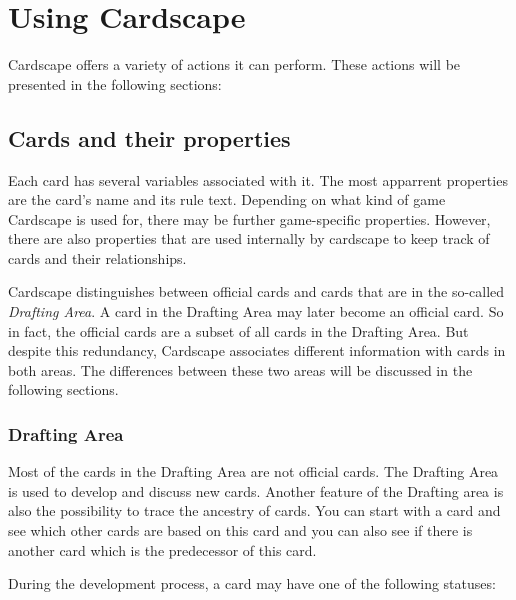 \documentclass[a4paper, 11pt]{scrbook}
\begin{document}
\chapter{Using Cardscape}
Cardscape offers a variety of actions it can perform. These actions will be presented in the following sections:


\section{Cards and their properties}
Each card has several variables associated with it. The most apparrent properties are the card's name and its rule text. Depending on what kind of game Cardscape is used for, there may be further game-specific properties. However, there are also properties that are used internally by cardscape to keep track of cards and their relationships.

Cardscape distinguishes between official cards and cards that are in the so-called \emph{Drafting Area}. A card in the Drafting Area may later become an official card. So in fact, the official cards are a subset of all cards in the Drafting Area. But despite this redundancy, Cardscape associates different information with cards in both areas. The differences between these two areas will be discussed in the following sections.

\subsection{Drafting Area}\label{DraftingArea}
Most of the cards in the Drafting Area are not official cards. The Drafting Area is used to develop and discuss new cards. Another feature of the Drafting area is also the possibility to trace the ancestry of cards. You can start with a card and see which other cards are based on this card and you can also see if there is another card which is the predecessor of this card.

During the development process, a card may have one of the following statuses:
\end{document}
